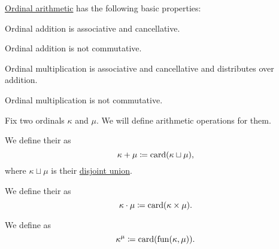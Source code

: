 \begin{proposition}\label{thm:ordinal_arithmetic_properties}
  \hyperref[def:ordinal_arithmetic]{Ordinal arithmetic} has the following basic properties:

  \begin{thmenum}
     Ordinal addition is associative and cancellative.

    \medskip

     Ordinal addition is not commutative.

    \medskip

     Ordinal multiplication is associative and cancellative and distributes over addition.

    \medskip

     Ordinal multiplication is not commutative.
  \end{thmenum}
\end{proposition}

\begin{definition}\label{def:cardinal_arithmetic}
  Fix two ordinals \( \kappa \) and \( \mu \). We will define arithmetic operations for them.

  \begin{thmenum}
     We define their  as
    \begin{equation*}
      \kappa + \mu \coloneqq \operatorname{card}(\kappa \sqcup \mu),
    \end{equation*}
    where \( \kappa \sqcup \mu \) is their \hyperref[def:disjoint_union]{disjoint union}.

     We define their  as
    \begin{equation*}
      \kappa \cdot \mu \coloneqq \operatorname{card}(\kappa \times \mu).
    \end{equation*}

     We define  as
    \begin{equation*}
      \kappa^\mu \coloneqq \operatorname{card}(\operatorname{fun}(\kappa, \mu)).
    \end{equation*}
  \end{thmenum}
\end{definition}

